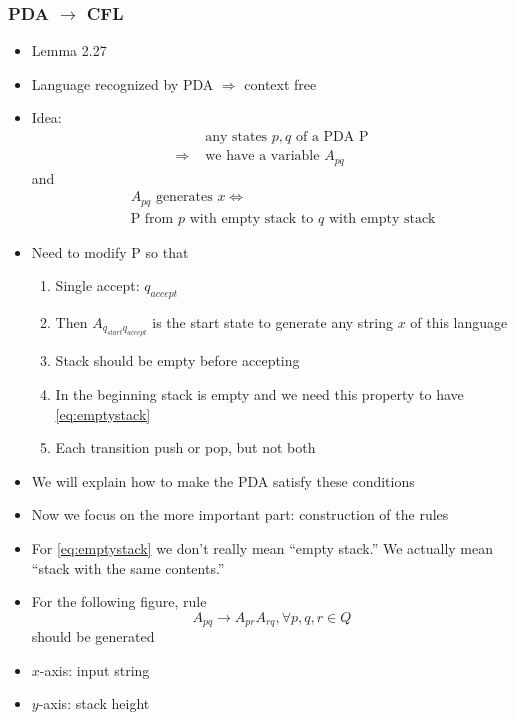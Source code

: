 




\begin{frame}[allowframebreaks]
  \frametitle{PDA $\rightarrow$ CFL}
  \begin{itemize}
\item Lemma 2.27
\item Language recognized by PDA
$\Rightarrow$ context free
\item Idea:
  \begin{equation*}
    \begin{split}
& \text{ any states } p,q \text{ of a PDA P} \\
\Rightarrow & \text{ we have a variable } A_{pq}
\end{split}
\end{equation*}
and
\begin{eqnarray}
&& \mbox{$A_{pq}$ generates $x
\Leftrightarrow$}  \label{eq:emptystack} \\ 
&& \mbox{P from $p$ with empty
stack to $q$ with empty stack}
\nonumber
\end{eqnarray}
\item Need to modify P so that

  \begin{enumerate}
  \item Single accept: $q_{accept}$

  \item [] Then  $A_{q_{start} q_{accept}}$
    is the start state to generate any string $x$
    of this language
  \item Stack should be empty before accepting
  \item [] In the beginning stack is empty and we need this property to
    have \eqref{eq:emptystack}
  \item Each transition push or pop, but not both
  \end{enumerate}

\item We will explain how to make the PDA satisfy these conditions

\item Now we focus on the more important part: construction of the rules

\item For \eqref{eq:emptystack} we don't really mean
  ``empty stack.'' We actually mean ``stack with the same
  contents.''
\item For the following figure, rule
  \begin{equation*}
    A_{pq} \rightarrow A_{pr} A_{rq}, \forall p, q, r \in Q
  \end{equation*}
should be generated
\item $x$-axis: input string
\item [] $y$-axis: stack height
  

\end{itemize}
\end{frame}

